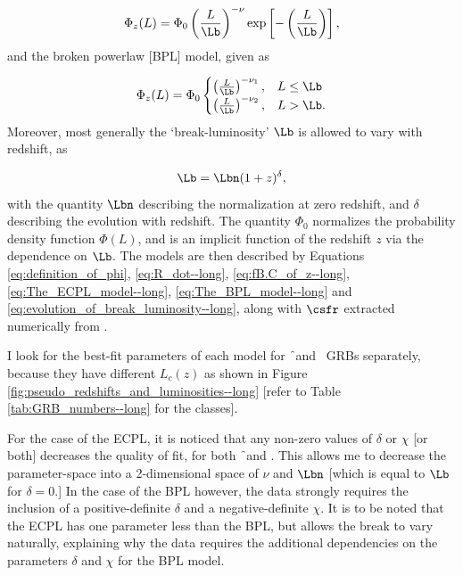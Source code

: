 \begin{equation}
\Phi_z(L) = \Phi_{0}
\left( \frac{L}{\Lb} \right)^{-\nu} \exp \left[ -\left( \frac{L}{\Lb} \right) \right],
\label{eq:The_ECPL_model--long}
\end{equation} and the broken powerlaw [BPL] model, given as

\begin{equation}
\Phi_z(L) = \Phi_{0} \begin{cases}
\left( \frac{L}{\Lb} \right)^{-\nu_1}, & L \leq \Lb\\
\left( \frac{L}{\Lb} \right)^{-\nu_2}, & L > \Lb.
\end{cases}
\label{eq:The_BPL_model--long}
\end{equation} Moreover, most generally the `break-luminosity' $\Lb$ is allowed to vary with redshift, as

\begin{equation}
\Lb = \Lbn (1+z)^{\delta},
\label{eq:evolution_of_break_luminosity--long}
\end{equation} with the quantity $\Lbn$ describing the normalization at zero redshift, and $\delta$ describing the evolution with redshift. The quantity $\Phi_0$ normalizes the probability density function $\Phi(L)$, and is an implicit function of the redshift $z$ via the dependence on $\Lb$. The models are then described by Equations \ref{eq:definition_of_phi}, \ref{eq:R_dot--long}, \ref{eq:fB.C_of_z--long}, \ref{eq:The_ECPL_model--long}, \ref{eq:The_BPL_model--long} and \ref{eq:evolution_of_break_luminosity--long}, along with $\csfr$ extracted numerically from .

I look for the best-fit parameters of each model for \f\ and \s\ GRBs separately, because they have different $L_c (z)$ as shown in Figure \ref{fig:pseudo_redshifts_and_luminosities--long} [refer to Table \ref{tab:GRB_numbers--long} for the classes].

For the case of the ECPL, it is noticed that any non-zero values of $\delta$ or $\chi$ [or both] decreases the quality of fit, for both \f\ and \s. This allows me to decrease the parameter-space into a 2-dimensional space of $\nu$ and $\Lbn$ [which is equal to $\Lb$ for $\delta = 0$.] In the case of the BPL however, the data strongly requires the inclusion of a positive-definite $\delta$ and a  negative-definite $\chi$. It is to be noted that the ECPL has one parameter less than the BPL, but allows the break to vary naturally, explaining why the data requires the additional dependencies on the parameters $\delta$ and $\chi$ for the BPL model.

